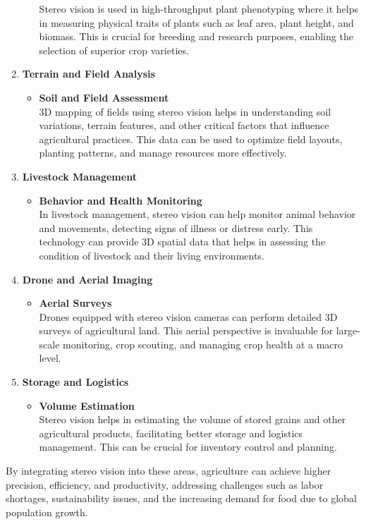 \documentclass[22pt]{report}
\begin{document}
\begin{enumerate}
\begin{itemize}
                        Stereo vision is used in high-throughput plant phenotyping where it helps in measuring physical traits of plants such as leaf area, plant height, and biomass. This is crucial for breeding and research purposes, enabling the selection of superior crop varieties.
                 \end{itemize}       
            \item \textbf{Terrain and Field Analysis}
                 \begin{itemize}
                     \item \textbf{Soil and Field Assessment}\\
                        3D mapping of fields using stereo vision helps in understanding soil variations, terrain features, and other critical factors that influence agricultural practices. This data can be used to optimize field layouts, planting patterns, and manage resources more effectively.
                 \end{itemize}
            \item \textbf{Livestock Management}
                 \begin{itemize}
                     \item \textbf{Behavior and Health Monitoring}\\
                        In livestock management, stereo vision can help monitor animal behavior and movements, detecting signs of illness or distress early. This technology can provide 3D spatial data that helps in assessing the condition of livestock and their living environments.
                 \end{itemize}
            \item \textbf{Drone and Aerial Imaging}
                \begin{itemize}
                    \item \textbf{Aerial Surveys}\\
                        Drones equipped with stereo vision cameras can perform detailed 3D surveys of agricultural land. This aerial perspective is invaluable for large-scale monitoring, crop scouting, and managing crop health at a macro level.
                \end{itemize}
            \item \textbf{Storage and Logistics}
                \begin{itemize}
                    \item \textbf{Volume Estimation}\\
                        Stereo vision helps in estimating the volume of stored grains and other agricultural products, facilitating better storage and logistics management. This can be crucial for inventory control and planning.
                \end{itemize}
        \end{enumerate}
        By integrating stereo vision into these areas, agriculture can achieve higher precision, efficiency, and productivity, addressing challenges such as labor shortages, sustainability issues, and the increasing demand for food due to global population growth.
\end{document}

